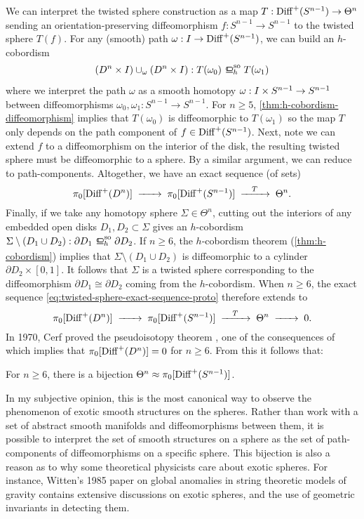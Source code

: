 	We can interpret the twisted sphere construction as a map $T: \Diff^+(S^{n-1})\to \Theta^n$ sending an orientation-preserving diffeomorphism $f : S^{n-1} \to S^{n-1}$ to the twisted sphere $T(f)$. For any (smooth) path $\omega : I \to \Diff^+(S^{n-1})$, we can build an $h$-cobordism 
	\[ (D^n\times I)\cup_\omega (D^n\times I) : T(\omega_0) \sohbord T(\omega_1)\]
	where we interpret the path $\omega$ as a smooth homotopy $\omega : I\times S^{n-1}\to\S^{n-1}$ between diffeomorphisms $\omega_0, \omega_1 : S^{n-1} \to S^{n-1}$. For $n\geq 5$, \cref{thm:h-cobordism-diffeomorphism} implies that $T(\omega_0)$ is diffeomorphic to $T(\omega_1)$ so the map $T$ only depends on the path component of $f\in \Diff^+(S^{n-1})$.
	Next, note we can extend $f$ to a diffeomorphism on the interior of the disk, the resulting twisted sphere must be diffeomorphic to a sphere. By a similar argument, we can reduce to path-components. Altogether, we have an exact sequence (of sets)
	\begin{equation}\label{eq:twisted-sphere-exact-sequence-proto}
		\pi_0 [\Diff^+(D^n)] \lkxto \pi_0 [\Diff^+(S^{n-1})] \lkxto[T] \Theta^n.
	\end{equation}
	Finally, if we take any homotopy sphere $\Sigma\in \Theta^n$, cutting out the interiors of any embedded open disks $D_1, D_2\subset \Sigma$ gives an $h$-cobordism $\Sigma\setminus(D_1\cup D_2) : \partial D_1 \sohbord \partial D_2$. If $n\geq 6$, the $h$-cobordism theorem (\ref{thm:h-cobordism}) implies that $\Sigma \setminus (D_1\cup D_2)$ is diffeomorphic to a cylinder $\partial D_2\times [0,1]$. It follows that $\Sigma$ is a twisted sphere corresponding to the diffeomorphism $\partial D_1 \cong \partial D_2$ coming from the $h$-cobordism.
	When $n\geq 6$, the exact sequence \cref{eq:twisted-sphere-exact-sequence-proto} therefore extends to 
	\[
		\pi_0 [\Diff^+(D^n)] \lkxto \pi_0 [\Diff^+(S^{n-1})] \lkxto[T] \Theta^n \lkxto 0.
	\]
	In 1970, Cerf proved the pseudoisotopy theorem \cite{cerf1970pseudoisotopy}, one of the consequences of which implies that $\pi_0[\Diff^+(D^n)]=0$ for $n\geq 6$. From this it follows that:

	\begin{proposition}
		For $n\geq 6$, there is a bijection $\Theta^n \cong \pi_0[\Diff^+(S^{n-1})]$.
	\end{proposition}

	In my subjective opinion, this is the most canonical way to observe the phenomenon of exotic smooth structures on the spheres. Rather than work with a set of abstract smooth manifolds and diffeomorphisms between them, it is possible to interpret the set of smooth structures on a sphere as the set of path-components of diffeomorphisms on a specific sphere. This bijection is also a reason as to why some theoretical physicists care about exotic spheres.  
	For instance, Witten's 1985 paper \cite{witten1985anomalies} on global anomalies in string theoretic models of gravity contains extensive discussions on exotic spheres, and the use of geometric invariants in detecting them.

